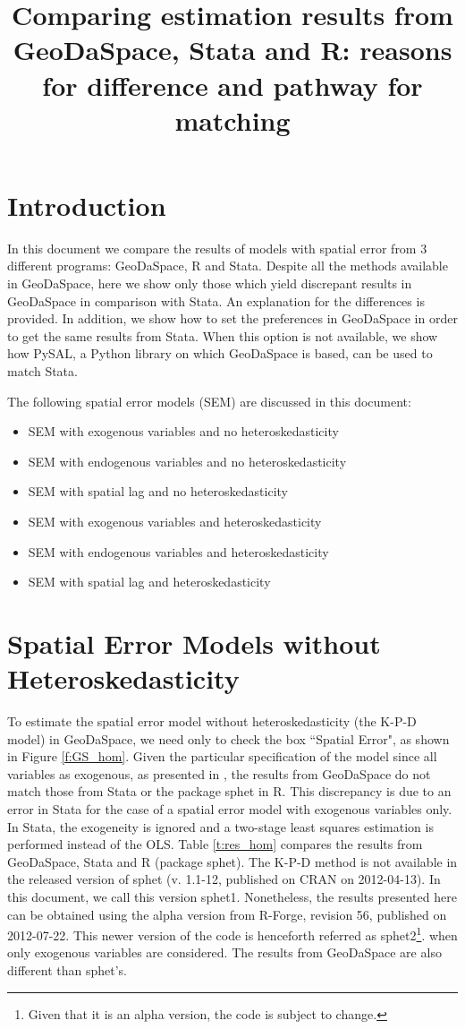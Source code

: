 \documentclass{article}
\title{Comparing estimation results from GeoDaSpace, Stata and R: reasons for difference and pathway for matching}
\author{}
\begin{document}
\maketitle
\section{Introduction}
In this document we compare the results of models with spatial error from 3 different programs: GeoDaSpace, R and Stata. Despite all the methods available in GeoDaSpace, here we show only those which yield discrepant results in GeoDaSpace in comparison with Stata. An explanation for the differences is provided. In addition, we show how to set the preferences in GeoDaSpace in order to get the same results from Stata. When this option is not available, we show how PySAL, a Python library on which GeoDaSpace is based, can be used to match Stata.

The following spatial error models (SEM) are discussed in this document:

\begin{itemize}
\item SEM with exogenous variables and no heteroskedasticity
\item SEM with endogenous variables and no heteroskedasticity
\item SEM with spatial lag and no heteroskedasticity
\item SEM with exogenous variables and heteroskedasticity
\item SEM with endogenous variables and heteroskedasticity
\item SEM with spatial lag and heteroskedasticity
\end{itemize}

\section{Spatial Error Models without Heteroskedasticity}

To estimate the spatial error model without heteroskedasticity (the K-P-D model) in GeoDaSpace, we need only to check the box ``Spatial Error", as shown in Figure \ref{f:GS_hom}. Given the particular specification of the model since all variables as exogenous, as presented in \citet{Anselin11}, the results from GeoDaSpace do not match those from Stata or the package sphet in R. This discrepancy is due to an error in Stata for the case of a spatial error model with exogenous variables only. In Stata, the exogeneity is ignored and a two-stage least squares estimation is performed instead of the OLS. Table \ref{t:res_hom} compares the results from GeoDaSpace, Stata and R (package sphet). The K-P-D method is not available in the released version of sphet (v. 1.1-12, published on CRAN on 2012-04-13). In this document, we call this version sphet1. Nonetheless, the results presented here can be obtained using the alpha version from R-Forge, revision 56, published on 2012-07-22. This newer version of the code is henceforth referred as sphet2\footnote{Given that it is an alpha version, the code is subject to change.}. when only exogenous variables are considered. The results from GeoDaSpace are also different than sphet's. 
\end{document}

